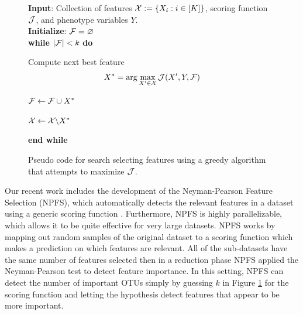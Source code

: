 \documentclass{acm_proc_article-sp}
\begin{document}
\begin{figure}
  \begin{framed}
    {\bf Input}: Collection of features ${\mathcal X}:=\{X_i: i \in[K]\}$, scoring function ${\mathcal J}$, and phenotype variables $Y$. \\
    {\bf Initialize}: ${\mathcal F} = \varnothing$ \\
    {\bf while} $|{\mathcal F}| < k$ {\bf do}
    \vspace{-.5em}
    \begin{mitemize}
      \item Compute next best feature
        \begin{align}
          X^* = \arg\max_{X' \in {\mathcal X}} {\mathcal J}(X',Y,{\mathcal F})
        \end{align}
      \item ${\mathcal F} \leftarrow {\mathcal F} \cup X^*$
      \item ${\mathcal X} \leftarrow {\mathcal X} \backslash X^*$
    \end{mitemize}
    \vspace{-.5em}
    {\bf end while}
  \end{framed}
  \caption{Pseudo code for search selecting features using a greedy algorithm that attempts to maximize ${\mathcal J}$. }
  \label{fig:greedy}
\end{figure}

Our recent work includes the development of the Neyman-Pearson Feature Selection (NPFS), which automatically detects the relevant features in a dataset using a generic scoring function \cite{Ditzler2014TNNLS}. Furthermore, NPFS is highly parallelizable, which allows it to be quite effective for very large datasets. NPFS works by mapping out random samples of the original dataset to a scoring function which makes a prediction on which features are relevant. All of the sub-datasets have the same number of features selected then in a reduction phase NPFS applied the Neyman-Pearson test to detect feature importance. In this setting, NPFS can detect the number of important OTUs simply by guessing $k$ in Figure \ref{fig:greedy} for the scoring function and letting the hypothesis detect features that appear to be more important. 
\end{document}

